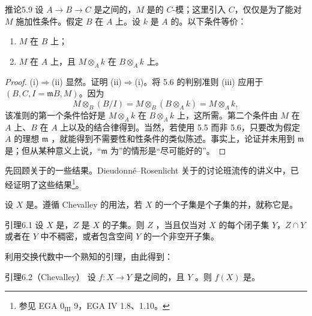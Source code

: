 \begin{SGAresult}{推论}{5.9}
设 $A\to B\to C$ 是之间的，$M$ 是的 $C$-模；这里引入 $C$，仅仅是为了能对 $M$ 施加性条件。假定 $B$ 在 $A$ 上。设 $k$ 是 $A$ 的。以下条件等价：
\begin{enumerate}
\item[(i)] $M$ 在 $B$ 上；
\item[(ii)] $M$ 在 $A$ 上，且 $M\otimes_A k$ 在 $B\otimes_A k$ 上。
\end{enumerate}
\end{SGAresult}
\begin{proof}
(i)$\Rightarrow$(ii) 显然。证明 (ii)$\Rightarrow$(i)。将 5.6 的判别准则 (iii) 应用于 $(B,C,I=\mathfrak mB,M)$。因为
\[
M\otimes_B(B/I)=M\otimes_B(B\otimes_A k)=M\otimes_A k,
\]
该准则的第一个条件恰好是 $M\otimes_A k$ 在 $B\otimes_A k$ 上，这所需。第二个条件由 $M$ 在 $A$ 上、$B$ 在 $A$ 上以及的结合律得到。当然，若使用 5.5 而非 5.6，只要改为假定 $A$ 的理想 $\mathfrak m$ ，就能得到不需要性和性条件的类似陈述。事实上，论证并未用到 $\mathfrak m$ 是；但从某种意义上说，“$\mathfrak m$ 为”的情形是“尽可能好的”。
\end{proof}

先回顾关于的一些结果。Dieudonné–Rosenlicht 关于的讨论班流传的讲义中，已经证明了这些结果\footnote{参见 EGA $0_{\mathrm{III}}$ 9，EGA IV 1.8、1.10。}。

设 $X$ 是。遵循 Chevalley 的用法，若 $X$ 的一个子集是个子集的并，就称它是。

\begin{SGAresult}{引理}{6.1}
设 $X$ 是，$Z$ 是 $X$ 的子集。则 $Z$ ，当且仅当对 $X$ 的每个闭子集 $Y$，$Z\cap Y$ 或者在 $Y$ 中不稠密，或者包含空间 $Y$ 的一个非空开子集。
\end{SGAresult}
利用交换代数中一个熟知的引理，由此得到：
\begin{SGAresult}{引理}{6.2（Chevalley）}
设 $f:X\to Y$ 是之间的，且 $Y$ 。则 $f(X)$ 是。
\end{SGAresult}

